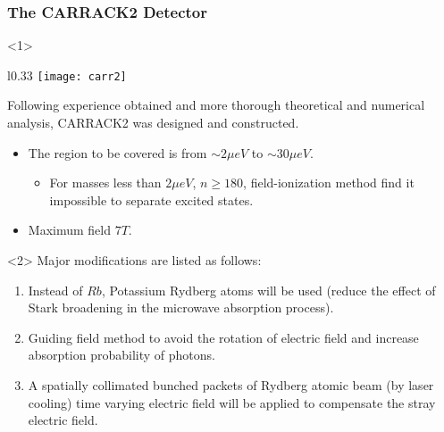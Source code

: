 \documentclass{beamer}
\begin{document}
\begin{frame}
  \frametitle{The CARRACK2 Detector}
  \begin{onlyenv}<1>
  \begin{wrapfigure}{l}{0.33\textwidth}
    \centering
    \texttt{[image: carr2]}
  \end{wrapfigure}
  Following experience obtained and more thorough theoretical and numerical
  analysis, CARRACK2 was designed and constructed.
  \begin{itemize}
  \item The region to be covered is from $\sim 2\mu eV$ to $\sim 30\mu eV$.
    \begin{itemize}
    \item For masses less than $2\mu eV$, $n \geq 180$, field-ionization
      method find it impossible to separate excited states.
    \end{itemize}
  \item Maximum field $7T$.
  \end{itemize}
  \end{onlyenv}
  \begin{onlyenv}<2>
    Major modifications are listed as follows:
    \begin{enumerate}
    \item Instead of $Rb$, Potassium Rydberg atoms will be used (reduce the
      effect of Stark broadening in the microwave absorption process).
    \item Guiding field method to avoid the rotation of electric field and
      increase absorption probability of photons.
    \item A spatially collimated bunched packets of Rydberg atomic beam (by
      laser cooling) time varying electric field will be applied to compensate
      the stray electric field.
    \end{enumerate}
  \end{onlyenv}
\end{frame}

\end{document}
